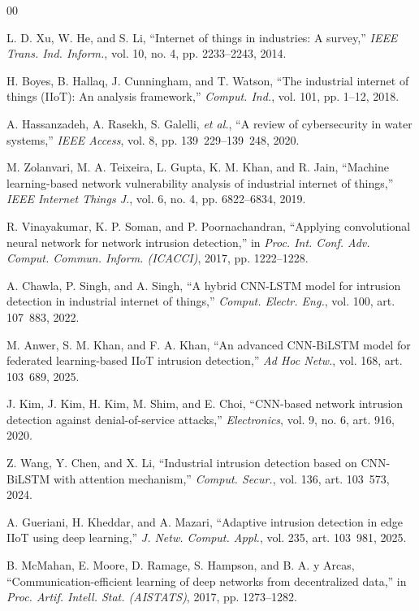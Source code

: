 \documentclass[10pt,journal]{IEEEtran}
\begin{document}
\begin{thebibliography}{00}

 L. D. Xu, W. He, and S. Li, ``Internet of things in industries: A survey,'' \textit{IEEE Trans. Ind. Inform.}, vol. 10, no. 4, pp. 2233--2243, 2014.

 H. Boyes, B. Hallaq, J. Cunningham, and T. Watson, ``The industrial internet of things (IIoT): An analysis framework,'' \textit{Comput. Ind.}, vol. 101, pp. 1--12, 2018.

 A. Hassanzadeh, A. Rasekh, S. Galelli, \textit{et al.}, ``A review of cybersecurity in water systems,'' \textit{IEEE Access}, vol. 8, pp. 139~229--139~248, 2020.

 M. Zolanvari, M. A. Teixeira, L. Gupta, K. M. Khan, and R. Jain, ``Machine learning-based network vulnerability analysis of industrial internet of things,'' \textit{IEEE Internet Things J.}, vol. 6, no. 4, pp. 6822--6834, 2019.

 R. Vinayakumar, K. P. Soman, and P. Poornachandran, ``Applying convolutional neural network for network intrusion detection,'' in \textit{Proc. Int. Conf. Adv. Comput. Commun. Inform. (ICACCI)}, 2017, pp. 1222--1228.

 A. Chawla, P. Singh, and A. Singh, ``A hybrid CNN-LSTM model for intrusion detection in industrial internet of things,'' \textit{Comput. Electr. Eng.}, vol. 100, art. 107~883, 2022.

 M. Anwer, S. M. Khan, and F. A. Khan, ``An advanced CNN-BiLSTM model for federated learning-based IIoT intrusion detection,'' \textit{Ad Hoc Netw.}, vol. 168, art. 103~689, 2025.

 J. Kim, J. Kim, H. Kim, M. Shim, and E. Choi, ``CNN-based network intrusion detection against denial-of-service attacks,'' \textit{Electronics}, vol. 9, no. 6, art. 916, 2020.

 Z. Wang, Y. Chen, and X. Li, ``Industrial intrusion detection based on CNN-BiLSTM with attention mechanism,'' \textit{Comput. Secur.}, vol. 136, art. 103~573, 2024.

 A. Gueriani, H. Kheddar, and A. Mazari, ``Adaptive intrusion detection in edge IIoT using deep learning,'' \textit{J. Netw. Comput. Appl.}, vol. 235, art. 103~981, 2025.

 B. McMahan, E. Moore, D. Ramage, S. Hampson, and B. A. y Arcas, ``Communication-efficient learning of deep networks from decentralized data,'' in \textit{Proc. Artif. Intell. Stat. (AISTATS)}, 2017, pp. 1273--1282.


\end{thebibliography}
\end{document}
